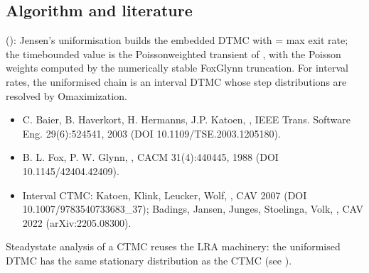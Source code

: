 \documentclass[a4paper,10pt,english]{sphinxmanual}
\begin{document}
\subsection{Algorithm and literature}
\label{\detokenize{manual/ctmc-csl:algorithm-and-literature}}
\sphinxAtStartPar
{} (): Jensen’s uniformisation builds the
embedded DTMC  with  = max exit rate; the time\sphinxhyphen{}bounded value is the
Poisson\sphinxhyphen{}weighted transient of , with the Poisson weights computed by the numerically
stable Fox\sphinxhyphen{}Glynn truncation. For interval rates, the uniformised chain is an interval
DTMC whose step distributions are resolved by O\sphinxhyphen{}maximization.
\begin{itemize}
\item {} 
\sphinxAtStartPar
C. Baier, B. Haverkort, H. Hermanns, J.\sphinxhyphen{}P. Katoen, , IEEE Trans. Software Eng. 29(6):524\sphinxhyphen{}541, 2003
(DOI 10.1109/TSE.2003.1205180).

\item {} 
\sphinxAtStartPar
B. L. Fox, P. W. Glynn, , CACM 31(4):440\sphinxhyphen{}445, 1988
(DOI 10.1145/42404.42409).

\item {} 
\sphinxAtStartPar
Interval CTMC: Katoen, Klink, Leucker, Wolf, ,
CAV 2007 (DOI 10.1007/978\sphinxhyphen{}3\sphinxhyphen{}540\sphinxhyphen{}73368\sphinxhyphen{}3\_37); Badings, Jansen, Junges, Stoelinga,
Volk, , CAV 2022
(arXiv:2205.08300).

\end{itemize}

\sphinxAtStartPar
Steady\sphinxhyphen{}state analysis of a CTMC reuses the LRA machinery: the uniformised DTMC has the
same stationary distribution as the CTMC (see {\hyperref[\detokenize{manual/lra-steadystate::doc}]{}}).
\end{document}
